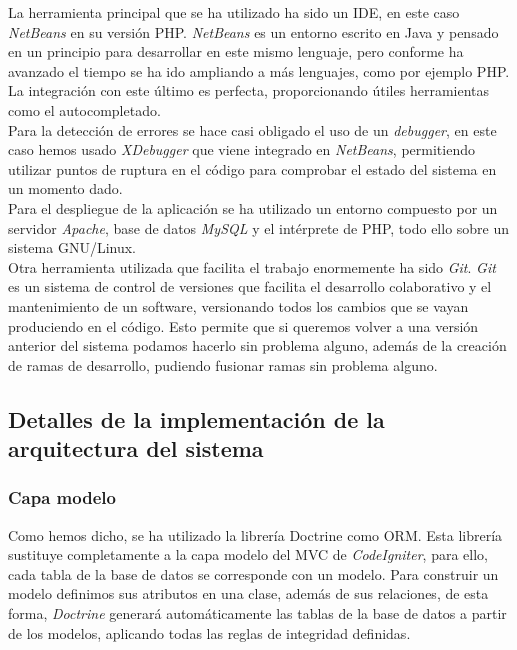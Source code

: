 \documentclass[a4paper,11pt]{article} %
\begin{document}
La herramienta principal que se ha utilizado ha sido un IDE, en este caso {\em NetBeans} en su versión PHP. {\em NetBeans} es un entorno escrito en Java y pensado en un principio para desarrollar en este mismo lenguaje, pero conforme ha avanzado el tiempo se ha ido ampliando a más lenguajes, como por ejemplo PHP. La integración con este último es perfecta, proporcionando útiles herramientas como el autocompletado.\\

Para la detección de errores se hace casi obligado el uso de un {\em debugger}, en este caso hemos usado {\em XDebugger} que viene integrado en {\em NetBeans}, permitiendo utilizar puntos de ruptura en el código para comprobar el estado del sistema en un momento dado.\\

Para el despliegue de la aplicación se ha utilizado un entorno compuesto por un servidor {\em Apache}, base de datos {\em MySQL} y el intérprete de PHP, todo ello sobre un sistema GNU/Linux.\\

Otra herramienta utilizada que facilita el trabajo enormemente ha sido {\em Git}. {\em Git} es un sistema de control de versiones que facilita el desarrollo colaborativo y el mantenimiento de un software, versionando todos los cambios que se vayan produciendo en el código. Esto permite que si queremos volver a una versión anterior del sistema podamos hacerlo sin problema alguno, además de la creación de ramas de desarrollo, pudiendo fusionar ramas sin problema alguno.\\

\subsection{Detalles de la implementación de la arquitectura del sistema}

\subsubsection{Capa modelo}

Como hemos dicho, se ha utilizado la librería Doctrine como ORM. Esta librería sustituye completamente a la capa modelo del MVC de {\em CodeIgniter}, para ello, cada tabla de la base de datos se corresponde con un modelo. Para construir un modelo definimos sus atributos en una clase, además de sus relaciones, de esta forma, {\em Doctrine} generará automáticamente las tablas de la base de datos a partir de los modelos, aplicando todas las reglas de integridad definidas.\\
\end{document}
